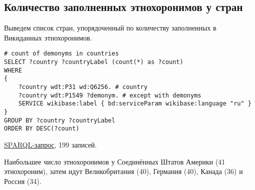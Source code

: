 \subsection{Количество заполненных этнохоронимов у стран}

Выведем список стран, упорядоченный по количеству заполненных в Викиданных этнохоронимов.

\begin{lstlisting}[language=SPARQL label=countcountry, caption=Cтраны упорядоченные по количеству заполненных этнохоронимов]
# сount of demonyms in countries
SELECT ?country ?countryLabel (count(*) as ?count)
WHERE
{
    ?country wdt:P31 wd:Q6256. # country
    ?country wdt:P1549 ?demonym. # except with demonyms
    SERVICE wikibase:label { bd:serviceParam wikibase:language "ru" }
}
GROUP BY ?country ?countryLabel
ORDER BY DESC(?count)
\end{lstlisting}

\href{https://query.wikidata.org/#%23Count%20of%20demonyms%20in%20countries%0ASELECT%20%20%3Fcountry%20%3FcountryLabel%20%28count%28%2a%29%20as%20%3Fcount%29%0AWHERE%0A%7B%0A%09%3Fcountry%20wdt%3AP31%20wd%3AQ6256.%20%20%20%20%20%20%23country%0A%09%3Fcountry%20wdt%3AP1549%20%3Fdemonym%20.%20%20%20%23demonym%0A%09SERVICE%20wikibase%3Alabel%20%7B%20bd%3AserviceParam%20wikibase%3Alanguage%20%22ru%22%20%7D%0A%7D%0A%0AGROUP%20BY%20%3Fcountry%20%3FcountryLabel%20%0AORDER%20BY%20DESC%28%3Fcount%29%0A}{SPARQL-запрос}, 199 записей. 

Наибольшее число этнохоронимов у Соединённых Штатов Америки (41 этнохороним), затем идут Великобритания (40), Германия (40), Канада (36) и Россия (34).